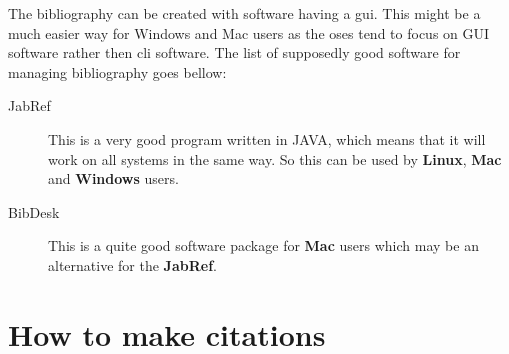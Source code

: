 \documentclass[
    draft
]{scrartcl}
\begin{document}
The bibliography can be created with software having a \ac{gui}. 
%
This might be a much easier way for Windows and Mac users as the \ac{oses} tend
to focus on GUI software rather then \ac{cli} software.
%
The list of supposedly good software for managing bibliography goes bellow:
%
\begin{description}
    \item[JabRef] This is a very good program written in JAVA, which means that
        it will work on all systems in the same way. So this can be used by
        \textbf{Linux}, \textbf{Mac} and \textbf{Windows} users.
        
    \item[BibDesk] This is a quite good software package for \textbf{Mac} users
        which may be an alternative for the \textbf{JabRef}.
\end{description}


\section{How to make citations}
\end{document}
